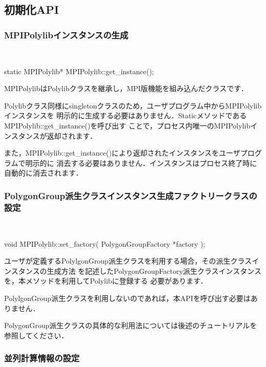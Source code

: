 {%
\subsection{初期化API}

%
\subsubsection{MPIPolylibインスタンスの生成}
　\\

\begin{program}
	static MPIPolylib* MPIPolylib::get_instance();
\end{program}

MPIPolylibはPolylibクラスを継承し，MPI版機能を組み込んだクラスです．

Polylibクラス同様にsingletonクラスのため，ユーザプログラム中からMPIPolylibインスタンスを
明示的に生成する必要はありません．StaticメソッドであるMPIPolylib::get\_instance()を呼び出す
ことで，プロセス内唯一のMPIPolylibインスタンスが返却されます．

また，MPIPolylib::get\_instance()により返却されたインスタンスをユーザプログラムで明示的に
消去する必要はありません．インスタンスはプロセス終了時に自動的に消去されます．

%
\subsubsection{PolygonGroup派生クラスインスタンス生成ファクトリークラスの設定}
　\\

\begin{program}
	void MPIPolylib::set_factory(
		PolygonGroupFactory *factory
	);
\end{program}

ユーザが定義するPolylgonGroup派生クラスを利用する場合，その派生クラスインスタンスの生成方法
を記述したPolygonGroupFactory派生クラスインスタンスを，本メソッドを利用してPolylibに登録する
必要があります．

PolylgonGroup派生クラスを利用しないのであれば，本APIを呼び出す必要はありません．

PolygonGroup派生クラスの具体的な利用法については後述のチュートリアルを参照してください．

%
\subsubsection{並列計算情報の設定}
　\\

}

